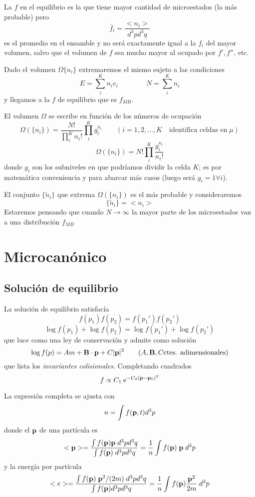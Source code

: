 \documentclass[10pt,oneside]{CBFT_book}
\begin{document}
La $f$ en el equilibrio es la que tiene mayor cantidad de microestados (la más probable) pero 
\[
	\bar{f}_i =  \frac{<n_i>}{d^3p d^3q}
\]
es el promedio en el ensamble y no será exactamente igual a la $f_i$ del mayor volumen, salvo que el volumen de $f$
sea mucho mayor al ocupado por $f',f''$, etc.

Dado el volumen $\Omega \{ n_i\}$ extremaremos el mismo sujeto a las condiciones
\[
	E = \sum_i^K n_i e_i \qquad \qquad N = \sum_i^K n_i
\]
y llegamos a la $f$ de equilibrio que es $f_{MB}$.

El volumen $\Omega$ se escribe en función de los números de ocupación
\[
	\Omega \left( \{ n_i \} \right) = 
	\frac{N!}{\prod_i^K n_i!} \prod_i^K g_i^{n_i} \qquad 
	(i=1,2,...,K \quad \text{identifica celdas en}\;\mu )
\]
\[
	\Omega \left( \{ n_i \} \right) = N! \prod_i^K \frac{g_i^{n_i}}{n_i!}
\]
donde $g_i$ son los subniveles en que podríamos dividir la celda $K$; es por matemática conveniencia y para abarcar 
más casos (luego será $g_i=1 \forall i$).

El conjunto $\{ \tilde{n}_i\}$ que extrema $\Omega \left( \{ n_i \} \right)$ es el más probable y consideraremos
\[
	\{ \tilde{n}_i\} = < n_i >
\]
Estaremos pensando que cuando $N \to \infty$ la mayor parte de los microestados van a una distribución $f_{MB}$


\section{Microcanónico}

\subsection{Solución de equilibrio}

La solución de equilibrio satisfacía
\[
	f(p_1) f(p_2) = f(p_1') f(p_2')
\]
\[
	\log f(p_1) + \log f(p_2) = \log f(p_1') + \log f(p_2')
\]
que luce como una ley de conservación y admite como solución
\[
	\log f(p) = A m + \vb{B}\cdot \vb{p} + C|\vb{p}|^2 
	\qquad (A,\vb{B},C \text{ctes. adimensionales})
\]
que lista los {\it invariantes colisionales}. Completando cuadrados
\[
	f \propto C_1 \euler^{-C_2(\vb{p} - \vb{p}_0)^2}
\]

La expresión completa se ajusta con 
\[
	n = \int f(\vb{p},t) d^3p
\]
donde el $\vb{p}$ de una partícula es
\[
	<\vb{p}> = \frac{\int f(\vb{p}) \vb{p} \; d^3p d^3q}{\int f(\vb{p}) \; d^3p d^3q } = 
	\frac{1}{n} \int f(\vb{p}) \; \vb{p} \; d^3p
\]
y la energía por partícula
\[
	<e> = \frac{\int f(\vb{p}) \; \vb{p}^2/ (2m) \; d^3p d^3q}{\int f(\vb{p}) d^3p d^3q } = 
	\frac{1}{n} \int f(\vb{p}) \frac{ \vb{p}^2 }{ 2m } \; d^3p
\]
\end{document}
